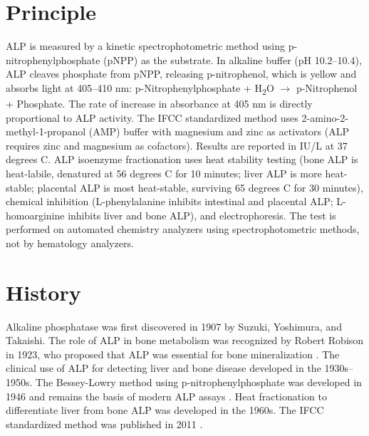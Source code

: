 \section*{Principle}
ALP is measured by a kinetic spectrophotometric method using p-nitrophenylphosphate (pNPP) as the substrate. In alkaline buffer (pH 10.2--10.4), ALP cleaves phosphate from pNPP, releasing p-nitrophenol, which is yellow and absorbs light at 405--410 nm: p-Nitrophenylphosphate + H\textsubscript{2}O $\rightarrow$ p-Nitrophenol + Phosphate. The rate of increase in absorbance at 405 nm is directly proportional to ALP activity. The IFCC standardized method uses 2-amino-2-methyl-1-propanol (AMP) buffer with magnesium and zinc as activators (ALP requires zinc and magnesium as cofactors). Results are reported in IU/L at 37 degrees C. ALP isoenzyme fractionation uses heat stability testing (bone ALP is heat-labile, denatured at 56 degrees C for 10 minutes; liver ALP is more heat-stable; placental ALP is most heat-stable, surviving 65 degrees C for 30 minutes), chemical inhibition (L-phenylalanine inhibits intestinal and placental ALP; L-homoarginine inhibits liver and bone ALP), and electrophoresis. The test is performed on automated chemistry analyzers using spectrophotometric methods, not by hematology analyzers.

\section*{History}
Alkaline phosphatase was first discovered in 1907 by Suzuki, Yoshimura, and Takaishi. The role of ALP in bone metabolism was recognized by Robert Robison in 1923, who proposed that ALP was essential for bone mineralization \cite{robison1923possible}. The clinical use of ALP for detecting liver and bone disease developed in the 1930s--1950s. The Bessey-Lowry method using p-nitrophenylphosphate was developed in 1946 and remains the basis of modern ALP assays \cite{bessey1946method}. Heat fractionation to differentiate liver from bone ALP was developed in the 1960s. The IFCC standardized method was published in 2011 \cite{ifcc2011ifcc}.

